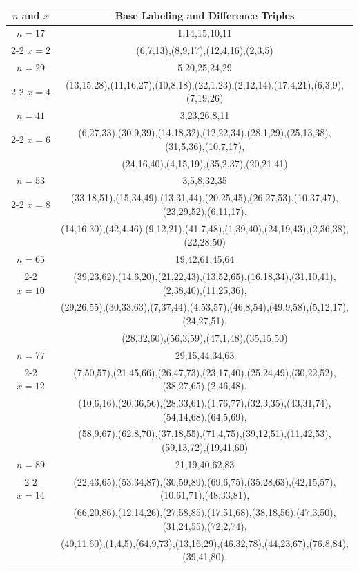 \begin{tabular}{| c | c |}
\hline
\(n\) and \(x\) & Base Labeling and Difference Triples\\
\hline
\(n=17\) & 
1,14,15,10,11\\
\cline{2-2}
\(x=2\)
&(6,7,13),(8,9,17),(12,4,16),(2,3,5)\\
\hline 
\(n=29\) & 
5,20,25,24,29\\
\cline{2-2}
\(x=4\)
&(13,15,28),(11,16,27),(10,8,18),(22,1,23),(2,12,14),(17,4,21),(6,3,9),(7,19,26)\\
\hline 
\(n=41\) & 
3,23,26,8,11\\
\cline{2-2}
\(x=6\)
&(6,27,33),(30,9,39),(14,18,32),(12,22,34),(28,1,29),(25,13,38),(31,5,36),(10,7,17),\\
&(24,16,40),(4,15,19),(35,2,37),(20,21,41)\\
\hline 
\(n=53\) & 
3,5,8,32,35\\
\cline{2-2}
\(x=8\)
&(33,18,51),(15,34,49),(13,31,44),(20,25,45),(26,27,53),(10,37,47),(23,29,52),(6,11,17),\\
&(14,16,30),(42,4,46),(9,12,21),(41,7,48),(1,39,40),(24,19,43),(2,36,38),(22,28,50)\\
\hline 
\(n=65\) & 
19,42,61,45,64\\
\cline{2-2}
\(x=10\)
&(39,23,62),(14,6,20),(21,22,43),(13,52,65),(16,18,34),(31,10,41),(2,38,40),(11,25,36),\\
&(29,26,55),(30,33,63),(7,37,44),(4,53,57),(46,8,54),(49,9,58),(5,12,17),(24,27,51),\\
&(28,32,60),(56,3,59),(47,1,48),(35,15,50)\\
\hline 
\(n=77\) & 
29,15,44,34,63\\
\cline{2-2}
\(x=12\)
&(7,50,57),(21,45,66),(26,47,73),(23,17,40),(25,24,49),(30,22,52),(38,27,65),(2,46,48),\\
&(10,6,16),(20,36,56),(28,33,61),(1,76,77),(32,3,35),(43,31,74),(54,14,68),(64,5,69),\\
&(58,9,67),(62,8,70),(37,18,55),(71,4,75),(39,12,51),(11,42,53),(59,13,72),(19,41,60)\\
\hline 
\(n=89\) & 
21,19,40,62,83\\
\cline{2-2}
\(x=14\)
&(22,43,65),(53,34,87),(30,59,89),(69,6,75),(35,28,63),(42,15,57),(10,61,71),(48,33,81),\\
&(66,20,86),(12,14,26),(27,58,85),(17,51,68),(38,18,56),(47,3,50),(31,24,55),(72,2,74),\\
&(49,11,60),(1,4,5),(64,9,73),(13,16,29),(46,32,78),(44,23,67),(76,8,84),(39,41,80),\\

\end{tabular}
